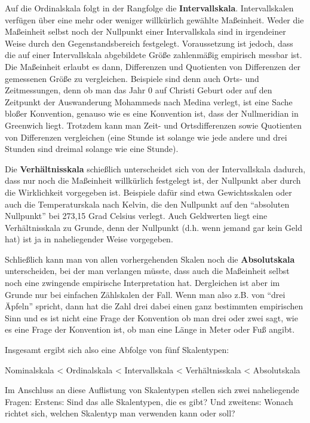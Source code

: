 Auf die Ordinalskala folgt in der Rangfolge die {\bf
Intervallskala}. Intervallskalen verfügen über eine
mehr oder weniger willkürlich gewählte Maßeinheit. Weder die Maßeinheit selbst
noch der Nullpunkt einer Intervallskala sind in irgendeiner Weise durch den
Gegenstandsbereich festgelegt. Voraussetzung ist jedoch, dass die auf einer
Intervallskala abgebildete Größe zahlenmäßig empirisch messbar ist. Die
Maßeinheit erlaubt es dann, Differenzen und Quotienten von Differenzen der
gemessenen Größe zu vergleichen. Beispiele sind denn auch Orts- und
Zeitmessungen, denn ob man das Jahr 0 auf Christi Geburt oder auf den Zeitpunkt
der Auswanderung Mohammeds nach Medina verlegt, ist eine Sache bloßer Konvention,
genauso wie es eine Konvention ist, dass der Nullmeridian in Greenwich liegt.
Trotzdem kann man Zeit- und Ortsdifferenzen sowie Quotienten von Differenzen
vergleichen (eine Stunde ist solange wie jede andere und drei Stunden sind
dreimal solange wie eine Stunde).

Die {\bf Verhältnisskala} schießlich unterscheidet
sich von der Intervallskala dadurch, dass nur noch die Maßeinheit willkürlich
festgelegt ist, der Nullpunkt aber durch die Wirklichkeit vorgegeben ist.
Beispiele dafür sind etwa Gewichtsskalen oder auch die Temperaturskala nach
Kelvin, die den Nullpunkt auf den "`absoluten Nullpunkt"' bei 273,15 Grad Celsius
verlegt. Auch Geldwerten liegt eine Verhältnisskala zu Grunde, denn der Nullpunkt
(d.h. wenn jemand gar kein Geld hat) ist ja in naheliegender Weise vorgegeben.

Schließlich kann man von allen vorhergehenden Skalen noch die {\bf
Absolutskala} unterscheiden, bei der man verlangen
müsste, dass auch die Maßeinheit selbst noch eine zwingende empirische
Interpretation hat. Dergleichen ist aber im Grunde nur bei einfachen Zählskalen
der Fall. Wenn man also z.B. von "`drei Äpfeln"' spricht, dann hat die Zahl drei
dabei einen ganz bestimmten empirischen Sinn und es ist nicht eine Frage der
Konvention ob man drei oder zwei sagt, wie es eine Frage der Konvention ist, ob
man eine Länge in Meter oder Fuß angibt.

Insgesamt ergibt sich also eine Abfolge von fünf Skalentypen: 

\begin{center}
{\small Nominalskala < Ordinalskala < Intervallskala < Verhältnisskala <
Absolutskala}
\end{center}

Im Anschluss an diese Auflistung von Skalentypen stellen sich zwei naheliegende
Fragen: Erstens: Sind das alle Skalentypen, die es gibt? Und zweitens: Wonach
richtet sich, welchen Skalentyp man verwenden kann oder soll?

